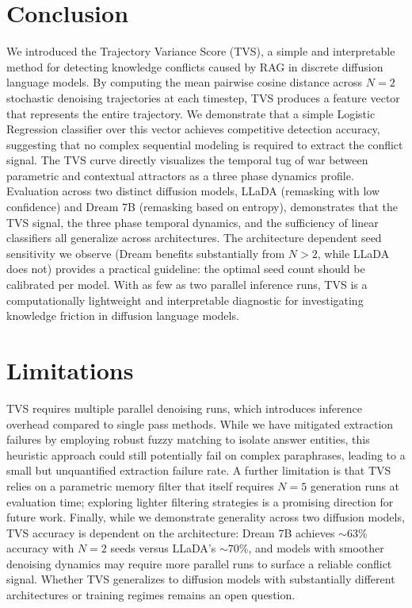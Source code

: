 \documentclass[11pt]{article}
\begin{document}
\section{Conclusion}
We introduced the Trajectory Variance Score (TVS), a simple and interpretable method for detecting knowledge conflicts caused by RAG in discrete diffusion language models. By computing the mean pairwise cosine distance across $N=2$ stochastic denoising trajectories at each timestep, TVS produces a feature vector that represents the entire trajectory. We demonstrate that a simple Logistic Regression classifier over this vector achieves competitive detection accuracy, suggesting that no complex sequential modeling is required to extract the conflict signal. The TVS curve directly visualizes the temporal tug of war between parametric and contextual attractors as a three phase dynamics profile. Evaluation across two distinct diffusion models, LLaDA (remasking with low confidence) and Dream 7B (remasking based on entropy), demonstrates that the TVS signal, the three phase temporal dynamics, and the sufficiency of linear classifiers all generalize across architectures. The architecture dependent seed sensitivity we observe (Dream benefits substantially from $N{>}2$, while LLaDA does not) provides a practical guideline: the optimal seed count should be calibrated per model. With as few as two parallel inference runs, TVS is a computationally lightweight and interpretable diagnostic for investigating knowledge friction in diffusion language models.

\section{Limitations}
TVS requires multiple parallel denoising runs, which introduces inference overhead compared to single pass methods. While we have mitigated extraction failures by employing robust fuzzy matching to isolate answer entities, this heuristic approach could still potentially fail on complex paraphrases, leading to a small but unquantified extraction failure rate. A further limitation is that TVS relies on a parametric memory filter that itself requires $N=5$ generation runs at evaluation time; exploring lighter filtering strategies is a promising direction for future work. Finally, while we demonstrate generality across two diffusion models, TVS accuracy is dependent on the architecture: Dream 7B achieves $\sim$63\% accuracy with $N=2$ seeds versus LLaDA's $\sim$70\%, and models with smoother denoising dynamics may require more parallel runs to surface a reliable conflict signal. Whether TVS generalizes to diffusion models with substantially different architectures or training regimes remains an open question.
\end{document}
